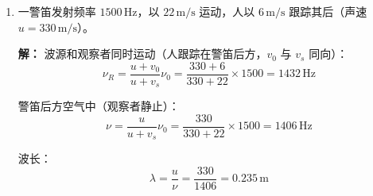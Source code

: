 \documentclass{ctexart}
\begin{document}
\begin{enumerate}
(3) 合成波（驻波）：
\[
y = y_{\lambda} + y_{\text{反}} = 2A\cos\left(2\pi\frac{x}{u} + \frac{\pi}{2}\right)\cos 2\pi ft
= -2A\sin\frac{2\pi x}{u}\cos 2\pi ft
\]

波腹：$\left|\sin\dfrac{2\pi x}{u}\right| = 1$，$x = \dfrac{2k+1}{4}\lambda$（$k = -1,-2,\dots$）

波节：$\left|\sin\dfrac{2\pi x}{u}\right| = 0$，$x = \dfrac{k}{2}\lambda$（$k = 0,-1,-2,\dots$）

\item 一警笛发射频率 $1500\,\text{Hz}$，以 $22\,\text{m/s}$ 运动，人以 $6\,\text{m/s}$ 跟踪其后（声速 $u = 330\,\text{m/s}$）。

\textbf{解：}
波源和观察者同时运动（人跟踪在警笛后方，$v_0$ 与 $v_s$ 同向）：
\[
\nu_R = \frac{u + v_0}{u + v_s}\nu_0 = \frac{330 + 6}{330 + 22} \times 1500 = 1432\,\text{Hz}
\]

警笛后方空气中（观察者静止）：
\[
\nu = \frac{u}{u + v_s}\nu_0 = \frac{330}{330 + 22} \times 1500 = 1406\,\text{Hz}
\]

波长：
\[
\lambda = \frac{u}{\nu} = \frac{330}{1406} = 0.235\,\text{m}
\]

\end{enumerate}
\end{document}
